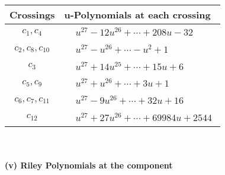 \documentclass[1p]{elsarticle_modified}
\theoremstyle{definition}
\begin{document}
\begin{tabular}{m{50pt}|m{274pt}}
Crossings & \hspace{64pt}u-Polynomials at each crossing \\
\hline $$\begin{aligned}c_{1},c_{4}\end{aligned}$$&$\begin{aligned}
&u^{27}-12 u^{26}+\cdots+208 u-32
\end{aligned}$\\
\hline $$\begin{aligned}c_{2},c_{8},c_{10}\end{aligned}$$&$\begin{aligned}
&u^{27}- u^{26}+\cdots- u^2+1
\end{aligned}$\\
\hline $$\begin{aligned}c_{3}\end{aligned}$$&$\begin{aligned}
&u^{27}+14 u^{25}+\cdots+15 u+6
\end{aligned}$\\
\hline $$\begin{aligned}c_{5},c_{9}\end{aligned}$$&$\begin{aligned}
&u^{27}+u^{26}+\cdots+3 u+1
\end{aligned}$\\
\hline $$\begin{aligned}c_{6},c_{7},c_{11}\end{aligned}$$&$\begin{aligned}
&u^{27}-9 u^{26}+\cdots+32 u+16
\end{aligned}$\\
\hline $$\begin{aligned}c_{12}\end{aligned}$$&$\begin{aligned}
&u^{27}+27 u^{26}+\cdots+69984 u+2544
\end{aligned}$\\
\hline
\end{tabular}\\~\\
\newpage\renewcommand{\arraystretch}{1}
\flushleft \textbf{(v) Riley Polynomials at the component}\newline \\
\end{document}
